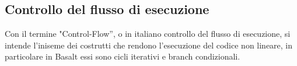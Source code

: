 \subsection{Controllo del flusso di esecuzione}
Con il termine "Control-Flow”, o in italiano controllo del flusso di esecuzione, si intende l’iniseme dei costrutti che rendono 
l’esecuzione del codice non lineare, in particolare in Basalt essi sono cicli iterativi e branch condizionali. 

 \newpage
 \newpage
 \newpage
 \newpage